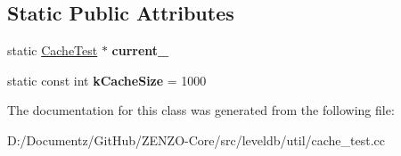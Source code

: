 \subsection*{Static Public Attributes}
\begin{DoxyCompactItemize}
\item 
\mbox{\label{classleveldb_1_1_cache_test_a91ef57f644d0531b882caed9547759f6}} 
static \mbox{\hyperlink{classleveldb_1_1_cache_test}{Cache\+Test}} $\ast$ {\bfseries current\+\_\+}
\item 
\mbox{\label{classleveldb_1_1_cache_test_a101eeca736aed0fde7048d0bf21b7e0a}} 
static const int {\bfseries k\+Cache\+Size} = 1000
\end{DoxyCompactItemize}


The documentation for this class was generated from the following file\+:\begin{DoxyCompactItemize}
\item 
D\+:/\+Documentz/\+Git\+Hub/\+Z\+E\+N\+Z\+O-\/\+Core/src/leveldb/util/cache\+\_\+test.\+cc\end{DoxyCompactItemize}
